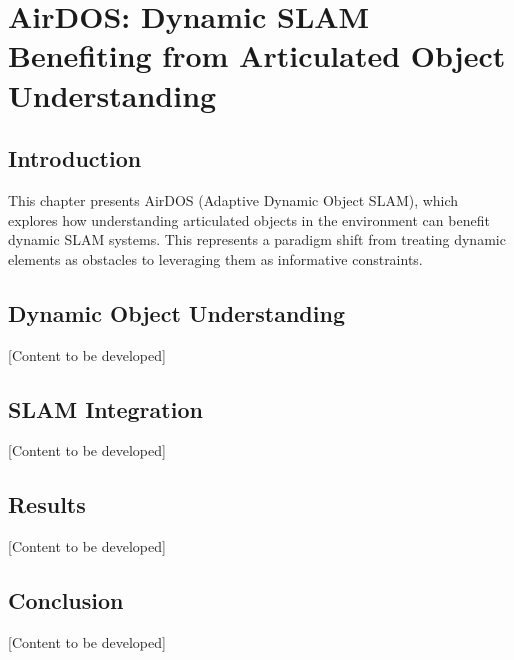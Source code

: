 \chapter{AirDOS: Dynamic SLAM Benefiting from Articulated Object Understanding} \label{chapter:airdos}

\section{Introduction}

This chapter presents AirDOS (Adaptive Dynamic Object SLAM), which explores how understanding articulated objects in the environment can benefit dynamic SLAM systems. This represents a paradigm shift from treating dynamic elements as obstacles to leveraging them as informative constraints.

\section{Dynamic Object Understanding}

[Content to be developed]

\section{SLAM Integration}

[Content to be developed]

\section{Results}

[Content to be developed]

\section{Conclusion}

[Content to be developed]